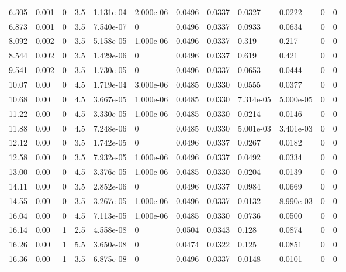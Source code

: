 \documentclass[preview]{standalone}
\begin{document}
{{\begin{tabular}{L{1.2cm}C{1.2cm} C{0.3cm}C{0.5cm} C{1.4cm}C{1.4cm} C{1.4cm}C{1.4cm} C{1.6cm}C{1.6cm} C{1.6cm}C{1.6cm}}
  6.305  &  0.001  & 0     & 3.5 &  1.131e-04  & 2.000e-06  &  0.0496&   0.0337& 0.0327 & 0.0222   &  0 & 0  \\ 
  6.873  &  0.001  & 0     & 3.5 &  7.540e-07  & 0  &  0.0496&   0.0337& 0.0933 & 0.0634   &  0 & 0  \\ 
  8.092  &  0.002  & 0     & 3.5 &  5.158e-05  & 1.000e-06  &  0.0496&   0.0337& 0.319 & 0.217   &  0 & 0  \\ 
  8.544  &  0.002  & 0     & 3.5 &  1.429e-06  & 0  &  0.0496&   0.0337& 0.619 & 0.421   &  0 & 0  \\ 
  9.541  &  0.002  & 0     & 3.5 &  1.730e-05  & 0  &  0.0496&   0.0337& 0.0653 & 0.0444   &  0 & 0  \\ 
  10.07  &  0.00  & 0     & 4.5 &  1.719e-04  & 3.000e-06  &  0.0485&   0.0330& 0.0555 & 0.0377   &  0 & 0  \\ 
  10.68  &  0.00  & 0     & 4.5 &  3.667e-05  & 1.000e-06  &  0.0485&   0.0330& 7.314e-05 & 5.000e-05   &  0 & 0  \\ 
  11.22  &  0.00  & 0     & 4.5 &  3.330e-05  & 1.000e-06  &  0.0485&   0.0330& 0.0214 & 0.0146   &  0 & 0  \\ 
  11.88  &  0.00  & 0     & 4.5 &  7.248e-06  & 0  &  0.0485&   0.0330& 5.001e-03 & 3.401e-03   &  0 & 0  \\ 
  12.12  &  0.00  & 0     & 3.5 &  1.742e-05  & 0  &  0.0496&   0.0337& 0.0267 & 0.0182   &  0 & 0  \\ 
  12.58  &  0.00  & 0     & 3.5 &  7.932e-05  & 1.000e-06  &  0.0496&   0.0337& 0.0492 & 0.0334   &  0 & 0  \\ 
  13.00  &  0.00  & 0     & 4.5 &  3.376e-05  & 1.000e-06  &  0.0485&   0.0330& 0.0204 & 0.0139   &  0 & 0  \\ 
  14.11  &  0.00  & 0     & 3.5 &  2.852e-06  & 0  &  0.0496&   0.0337& 0.0984 & 0.0669   &  0 & 0  \\ 
  14.55  &  0.00  & 0     & 3.5 &  3.267e-05  & 1.000e-06  &  0.0496&   0.0337& 0.0132 & 8.990e-03   &  0 & 0  \\ 
  16.04  &  0.00  & 0     & 4.5 &  7.113e-05  & 1.000e-06  &  0.0485&   0.0330& 0.0736 & 0.0500   &  0 & 0  \\ 
  16.14  &  0.00  & 1     & 2.5 &  4.558e-08  & 0  &  0.0504&   0.0343& 0.128 & 0.0874   &  0 & 0  \\ 
  16.26  &  0.00  & 1     & 5.5 &  3.650e-08  & 0  &  0.0474&   0.0322& 0.125 & 0.0851   &  0 & 0  \\ 
  16.36  &  0.00  & 1     & 3.5 &  6.875e-08  & 0  &  0.0496&   0.0337& 0.0148 & 0.0101   &  0 & 0  \\ 

\end{tabular}}}
\end{document}
